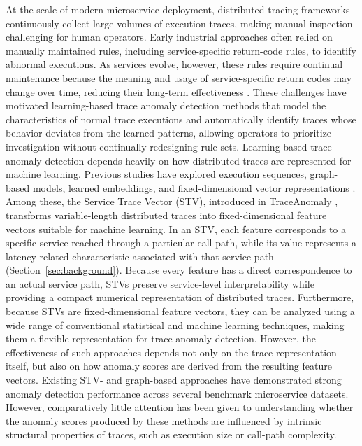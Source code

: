 \documentclass[informatics,article,submit,moreauthors]{Definitions/mdpi}
\begin{document}
At the scale of modern microservice deployment, distributed tracing
frameworks continuously collect large volumes of execution traces,
making manual inspection challenging for human operators. Early
industrial approaches often relied on manually maintained rules,
including service-specific return-code rules, to identify abnormal
executions. As services evolve, however, these rules require continual
maintenance because the meaning and usage of service-specific return
codes may change over time, reducing their long-term effectiveness
\cite{liu2020traceanomaly}. These challenges have motivated
learning-based trace anomaly detection methods that model the
characteristics of normal trace executions and automatically identify
traces whose behavior deviates from the learned patterns, allowing
operators to prioritize investigation without continually redesigning
rule sets.
Learning-based trace anomaly detection depends heavily on how
distributed traces are represented for machine learning. Previous
studies have explored execution sequences, graph-based models,
learned embeddings, and fixed-dimensional vector representations \cite{liu2020traceanomaly,zhang2022deeptralog,xie2023tracevae}. Among these, the Service Trace Vector (STV), introduced in
TraceAnomaly \cite{liu2020traceanomaly, wei2025traloganomaly}, transforms variable-length
distributed traces into fixed-dimensional feature vectors suitable for
machine learning. In an STV, each feature corresponds to a specific
service reached through a particular call path, while its value
represents a latency-related characteristic associated with that
service path (Section~\ref{sec:background}). Because every feature has
a direct correspondence to an actual service path, STVs preserve
service-level interpretability while providing a compact numerical
representation of distributed traces. Furthermore, because STVs are
fixed-dimensional feature vectors, they can be analyzed using a wide
range of conventional statistical and machine learning techniques,
making them a flexible representation for trace anomaly detection.
However, the effectiveness of such approaches depends not only on the
trace representation itself, but also on how anomaly scores are
derived from the resulting feature vectors. Existing STV- and graph-based approaches have demonstrated strong anomaly detection performance across several benchmark microservice datasets. However, comparatively little attention has been given to understanding whether the anomaly scores produced by these methods are influenced by intrinsic structural properties of traces, such as execution size or call-path complexity.
\end{document}
